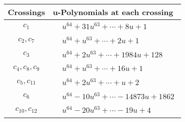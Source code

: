 \documentclass[1p]{elsarticle_modified}
\theoremstyle{definition}
\begin{document}
\begin{tabular}{m{50pt}|m{274pt}}
Crossings & \hspace{64pt}u-Polynomials at each crossing \\
\hline $$\begin{aligned}c_{1}\end{aligned}$$&$\begin{aligned}
&u^{64}+31 u^{63}+\cdots+8 u+1
\end{aligned}$\\
\hline $$\begin{aligned}c_{2},c_{7}\end{aligned}$$&$\begin{aligned}
&u^{64}+u^{63}+\cdots+2 u+1
\end{aligned}$\\
\hline $$\begin{aligned}c_{3}\end{aligned}$$&$\begin{aligned}
&u^{64}+2 u^{63}+\cdots+1984 u+128
\end{aligned}$\\
\hline $$\begin{aligned}c_{4},c_{8},c_{9}\end{aligned}$$&$\begin{aligned}
&u^{64}+u^{63}+\cdots+16 u+1
\end{aligned}$\\
\hline $$\begin{aligned}c_{5},c_{11}\end{aligned}$$&$\begin{aligned}
&u^{64}+2 u^{63}+\cdots+u+2
\end{aligned}$\\
\hline $$\begin{aligned}c_{6}\end{aligned}$$&$\begin{aligned}
&u^{64}-10 u^{63}+\cdots-14873 u+1862
\end{aligned}$\\
\hline $$\begin{aligned}c_{10},c_{12}\end{aligned}$$&$\begin{aligned}
&u^{64}-20 u^{63}+\cdots-19 u+4
\end{aligned}$\\
\hline
\end{tabular}\\~\\
\newpage\renewcommand{\arraystretch}{1}
\end{document}

